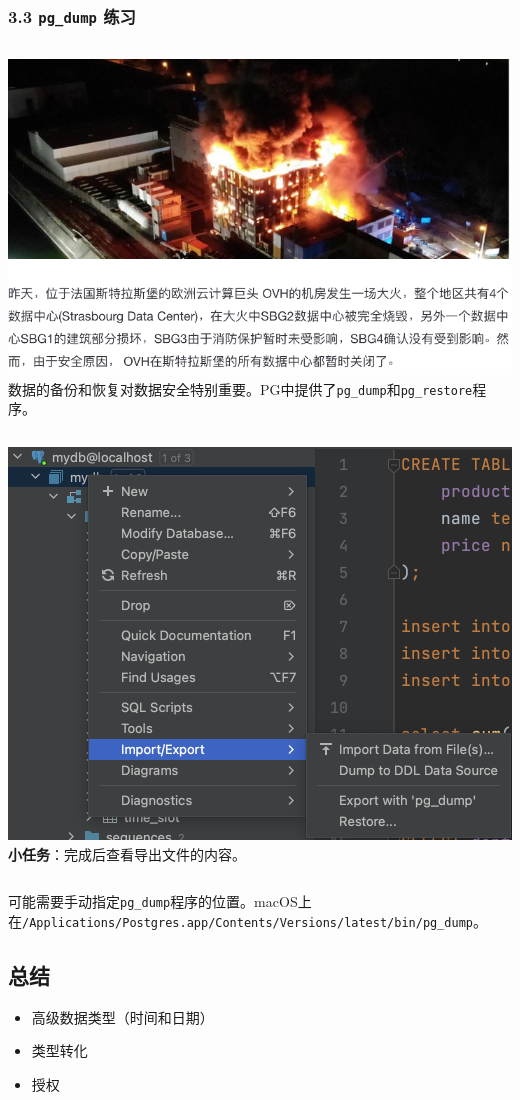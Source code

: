 \documentclass[aspectratio=169, 14pt]{beamer}
\begin{document}
\begin{frame}
    \frametitle{3.3 \texttt{pg\_dump} 练习}

\begin{columns}
    \includegraphics[width=\textwidth]{advanced/fire}
    数据的备份和恢复对数据安全特别重要。PG中提供了\texttt{pg\_dump}和\texttt{pg\_restore}程序。
\end{columns}

\end{frame}

\begin{frame}

    \begin{columns}
        \includegraphics[width=\textwidth]{advanced/dump}
         \textbf{小任务}：完成后查看导出文件的内容。
    \end{columns}
可能需要手动指定\texttt{pg\_dump}程序的位置。macOS上在{\small \texttt{/Applications/Postgres.app/Contents/Versions/latest/bin/pg\_dump}}。
\end{frame}


\begin{frame}[fragile]
    \section{\textcolor{darkmidnightblue}{总结}}

    \begin{itemize}
        \item 高级数据类型（时间和日期）
        \item 类型转化
        \item 授权
    \end{itemize}
\end{frame}
\end{document}
